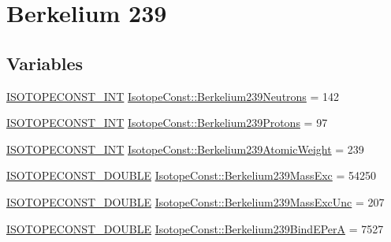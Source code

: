 \hypertarget{group___isotope_const-_berkelium-_bk239}{}\section{Berkelium 239}
\label{group___isotope_const-_berkelium-_bk239}
\subsection*{Variables}
\begin{DoxyCompactItemize}
\item 
\mbox{\hyperlink{group___isotope_const-_macros_ga5f18360b3e99483a35c32d789e62621c}{I\+S\+O\+T\+O\+P\+E\+C\+O\+N\+S\+T\+\_\+\+I\+NT}} \mbox{\hyperlink{group___isotope_const-_berkelium-_bk239_ga90fa7b16405b16dd6a933e43143ffe3f}{Isotope\+Const\+::\+Berkelium239\+Neutrons}} = 142
\item 
\mbox{\hyperlink{group___isotope_const-_macros_ga5f18360b3e99483a35c32d789e62621c}{I\+S\+O\+T\+O\+P\+E\+C\+O\+N\+S\+T\+\_\+\+I\+NT}} \mbox{\hyperlink{group___isotope_const-_berkelium-_bk239_ga00b9cdc1786a4596b08eccbf5518097a}{Isotope\+Const\+::\+Berkelium239\+Protons}} = 97
\item 
\mbox{\hyperlink{group___isotope_const-_macros_ga5f18360b3e99483a35c32d789e62621c}{I\+S\+O\+T\+O\+P\+E\+C\+O\+N\+S\+T\+\_\+\+I\+NT}} \mbox{\hyperlink{group___isotope_const-_berkelium-_bk239_ga7036cf9e2f9f7006b5616cdb0dd8f179}{Isotope\+Const\+::\+Berkelium239\+Atomic\+Weight}} = 239
\item 
\mbox{\hyperlink{group___isotope_const-_macros_ga8f45a7272ce02c0b4c65c44636ed719a}{I\+S\+O\+T\+O\+P\+E\+C\+O\+N\+S\+T\+\_\+\+D\+O\+U\+B\+LE}} \mbox{\hyperlink{group___isotope_const-_berkelium-_bk239_ga51cc5c684309ff97e5969083f61fd333}{Isotope\+Const\+::\+Berkelium239\+Mass\+Exc}} = 54250
\item 
\mbox{\hyperlink{group___isotope_const-_macros_ga8f45a7272ce02c0b4c65c44636ed719a}{I\+S\+O\+T\+O\+P\+E\+C\+O\+N\+S\+T\+\_\+\+D\+O\+U\+B\+LE}} \mbox{\hyperlink{group___isotope_const-_berkelium-_bk239_gace668ae8d4b107192daa76e18b2bd0dd}{Isotope\+Const\+::\+Berkelium239\+Mass\+Exc\+Unc}} = 207
\item 
\mbox{\hyperlink{group___isotope_const-_macros_ga8f45a7272ce02c0b4c65c44636ed719a}{I\+S\+O\+T\+O\+P\+E\+C\+O\+N\+S\+T\+\_\+\+D\+O\+U\+B\+LE}} \mbox{\hyperlink{group___isotope_const-_berkelium-_bk239_ga5bdf53fcfe676cc7fb09053768ad8421}{Isotope\+Const\+::\+Berkelium239\+Bind\+E\+PerA}} = 7527
\item 

\end{DoxyCompactItemize}
